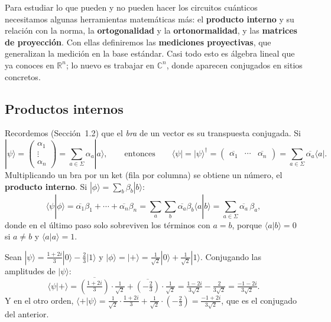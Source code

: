 \documentclass[11pt, a4paper, twoside, openright]{report}
\begin{document}
\noindent Para estudiar lo que pueden y no pueden hacer los circuitos cuánticos necesitamos algunas herramientas matemáticas más: el \textbf{producto interno} y su relación con la norma, la \textbf{ortogonalidad} y la \textbf{ortonormalidad}, y las \textbf{matrices de proyección}. Con ellas definiremos las \textbf{mediciones proyectivas}, que generalizan la medición en la base estándar. Casi todo esto es álgebra lineal que ya conoces en $\mathbb{R}^n$; lo nuevo es trabajar en $\mathbb{C}^n$, donde aparecen conjugados en sitios concretos.

\subsection{Productos internos}

\noindent Recordemos (Sección~1.2) que el \textit{bra} de un vector es su transpuesta conjugada. Si
\[ |\psi\rangle = \begin{pmatrix}\alpha_1\\ \vdots\\ \alpha_n\end{pmatrix} = \sum_{a\in\Sigma}\alpha_a|a\rangle, \qquad \text{entonces} \qquad \langle\psi| = |\psi\rangle^\dagger = \begin{pmatrix}\overline{\alpha_1} & \cdots & \overline{\alpha_n}\end{pmatrix} = \sum_{a\in\Sigma}\overline{\alpha_a}\langle a|. \]
Multiplicando un bra por un ket (fila por columna) se obtiene un número, el \textbf{producto interno}. Si $|\phi\rangle = \sum_b\beta_b|b\rangle$:
\[ \langle\psi|\phi\rangle = \overline{\alpha_1}\beta_1 + \cdots + \overline{\alpha_n}\beta_n = \sum_{a}\sum_{b}\overline{\alpha_a}\beta_b\langle a|b\rangle = \sum_{a\in\Sigma}\overline{\alpha_a}\,\beta_a, \]
donde en el último paso solo sobreviven los términos con $a = b$, porque $\langle a|b\rangle = 0$ si $a\neq b$ y $\langle a|a\rangle = 1$.

\begin{tcolorbox}[colback=cyan!5!white,colframe=cyan!75!black,title=\textbf{Ejemplo: Calcular un producto interno}]
Sean $|\psi\rangle = \frac{1+2i}{3}|0\rangle - \frac23|1\rangle$ y $|\phi\rangle = |+\rangle = \frac{1}{\sqrt2}|0\rangle + \frac{1}{\sqrt2}|1\rangle$. Conjugando las amplitudes de $|\psi\rangle$:
\[ \langle\psi|+\rangle = \overline{\left(\tfrac{1+2i}{3}\right)}\cdot\tfrac{1}{\sqrt2} + \overline{\left(-\tfrac23\right)}\cdot\tfrac{1}{\sqrt2} = \tfrac{1-2i}{3\sqrt2} - \tfrac{2}{3\sqrt2} = \tfrac{-1-2i}{3\sqrt2}. \]
Y en el otro orden, $\langle +|\psi\rangle = \frac{1}{\sqrt2}\cdot\frac{1+2i}{3} + \frac{1}{\sqrt2}\cdot\left(-\frac23\right) = \frac{-1+2i}{3\sqrt2}$, que es el conjugado del anterior.
\end{tcolorbox}
\end{document}

